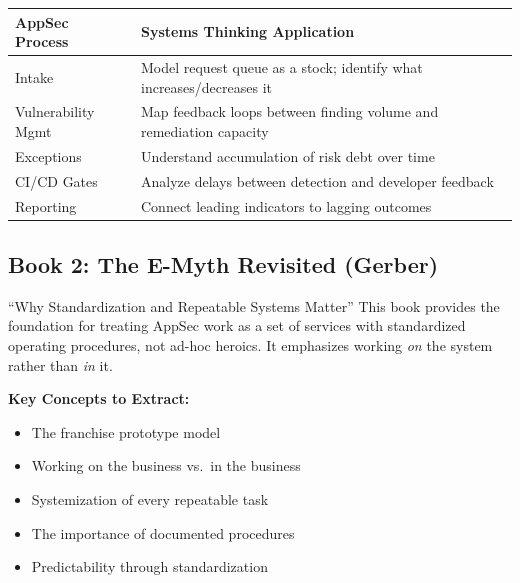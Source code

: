 \documentclass[11pt,letterpaper]{article}
\begin{document}
\begin{center}
\renewcommand{\arraystretch}{1.3}
\begin{tabular}{p{4cm}p{9cm}}
\toprule
\textbf{AppSec Process} & \textbf{Systems Thinking Application} \\
\midrule
Intake & Model request queue as a stock; identify what increases/decreases it \\
Vulnerability Mgmt & Map feedback loops between finding volume and remediation capacity \\
Exceptions & Understand accumulation of risk debt over time \\
CI/CD Gates & Analyze delays between detection and developer feedback \\
Reporting & Connect leading indicators to lagging outcomes \\
\bottomrule
\end{tabular}
\end{center}

\newpage

\subsection{Book 2: The E-Myth Revisited (Gerber)}

\begin{bookbox}{``Why Standardization and Repeatable Systems Matter''}
This book provides the foundation for treating AppSec work as a set of services with standardized operating procedures, not ad-hoc heroics. It emphasizes working \textit{on} the system rather than \textit{in} it.

\vspace{0.5cm}

\textbf{Key Concepts to Extract:}
\begin{itemize}[nosep]
    \item The franchise prototype model
    \item Working on the business vs.\ in the business
    \item Systemization of every repeatable task
    \item The importance of documented procedures
    \item Predictability through standardization
\end{itemize}
\end{bookbox}
\end{document}
